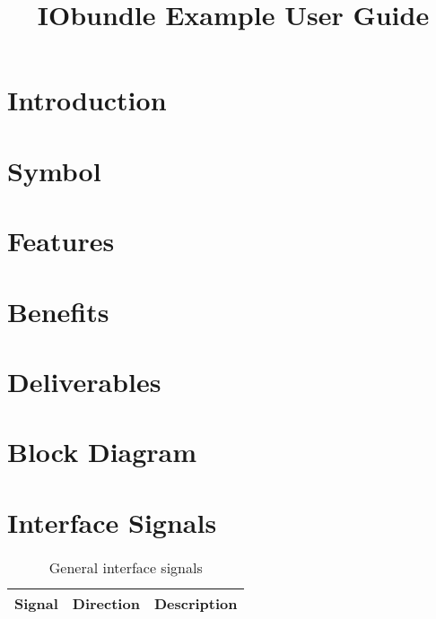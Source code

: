 \documentclass{../../submodules/TEX/document/ug/ug}
\title{IObundle Example User Guide}
\theoremstyle{plain}
\begin{document}
\maketitle
\cleardoublepage
\tableofcontents
\clearpage
\listoftables
\clearpage
\listoffigures
\cleardoublepage

\section{\textcolor[rgb]{0,0,0}{Introduction}}


\section{Symbol}


\section{\textcolor[rgb]{0,0,0}{Features}}


\section{\textcolor[rgb]{0,0,0}{Benefits}}


\section{\textcolor[rgb]{0,0,0}{Deliverables}}


\section*{\textcolor[rgb]{0,0,0}{Block Diagram}}


\section{Interface Signals}

\begin{table}[H]
  \begin{center}
    \begin{tabular}{|l|l|p{8cm}|}
      \hline
      \rowcolor{iob-green}
      \textbf{Signal} & \textbf{Direction} & \textbf{Description} \\
      \hline
      \hline


    \end{tabular}
    \caption{General interface signals}
    \label{tab:is}
  \end{center}
\end{table}
\end{document}
